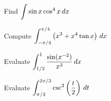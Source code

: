 \documentclass[notes]{subfiles}
\begin{document}
		\begin{ex}
			Find $\displaystyle \int \sin x \cos^4 x\, dx$
		\end{ex}
			
		\begin{ex}
			Compute $\displaystyle \int_{-\pi/4}^{\pi/4} \left( x^3 + x^4 \tan x\right)\, dx$
		\end{ex}
			\newpage
			
		\begin{ex}
			Evaluate $\displaystyle \int_{1/2}^1 \dfrac{\sin (x^{-2})}{x^3}\, dx$
		\end{ex}
		
		\begin{ex}
			Evaluate $\displaystyle \int_{\pi/3}^{2\pi/3} \csc^2\left( \dfrac{t}{2}\right)\,dt$
		\end{ex}
	\clearpage
\end{document}
